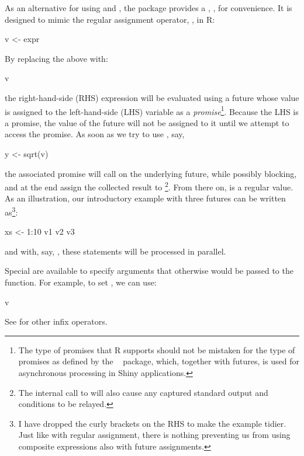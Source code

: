 As an alternative for using  and ,
the  package provides a , \code{\%<-\%}, for convenience.  It is designed to mimic
the regular assignment operator, \code{<-}, in R:
\begin{example}
v <- expr
\end{example}
By replacing the above with:
\begin{example}
v %
\end{example}
the right-hand-side (RHS) expression  will be evaluated
using a future whose value is assigned to the left-hand-side (LHS)
variable  as a \emph{promise}\footnote{The type of promises
that R supports should not be mistaken for the type of promises as
defined by the ~\citep{CRAN:promises} package,
which, together with futures, is used for asynchronous processing in
Shiny applications.}.  Because the LHS is a promise, the value of the
future will not be assigned to it until we attempt to access the
promise.  As soon as we try to use , say,
\begin{example}
y <- sqrt(v) 
\end{example}
the associated promise will call  on the underlying
future, while possibly blocking, and at the end assign the collected
result to \footnote{The internal call to  will
also cause any captured standard output and conditions to be
relayed.}.  From there on,  is a regular value.  As an
illustration, our introductory example with three futures can be
written as\footnote{I have dropped the curly brackets on the RHS to
make the example tidier. Just like with regular assignment, there is
nothing preventing us from using composite expressions also with
future assignments.}:
\begin{example}
xs <- 1:10
v1 %
v2 %
v3 %
\end{example}
and with, say, , these statements will be
processed in parallel.

Special  are available to specify arguments that
otherwise would be passed to the  function.  For
example, to set , we can use:
\begin{example}
v %
\end{example}
See  for other infix
operators.

